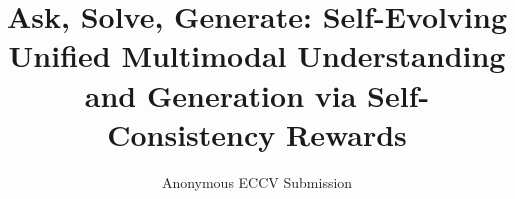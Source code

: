 \documentclass[runningheads]{llncs}
\begin{document}
\title{Ask, Solve, Generate: Self-Evolving Unified Multimodal Understanding and Generation via Self-Consistency Rewards} 


\author{Anonymous ECCV Submission}



\maketitle















\FloatBarrier

%
%


\end{document}
